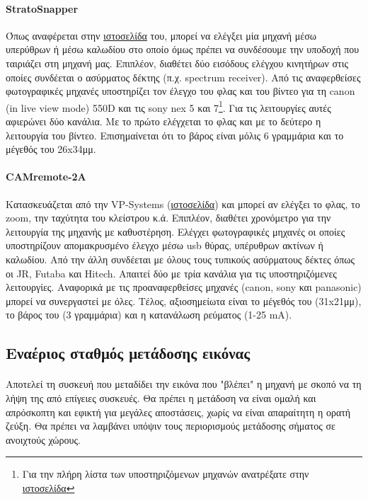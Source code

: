 \documentclass[a4paper, 12pt, twoside]{report}
\begin{document}
{{{{{{			\paragraph{StratoSnapper}{Όπως αναφέρεται στην \href{http://littlesmartthings.com/stratosnapper/}{ιστοσελίδα} του, μπορεί να ελέγξει μία μηχανή μέσω υπερύθρων ή μέσω καλωδίου στο οποίο όμως πρέπει να συνδέσουμε την υποδοχή που ταιριάζει στη μηχανή μας. Επιπλέον, διαθέτει δύο εισόδους ελέγχου κινητήρων στις οποίες συνδέεται ο ασύρματος δέκτης (π.χ. spectrum receiver). Από τις αναφερθείσες φωτογραφικές μηχανές υποστηρίζει τον έλεγχο του φλας και του βίντεο για τη canon (in live view mode) 550D και τις sony nex 5 και 7\footnote{Για την πλήρη λίστα των υποστηριζόμενων μηχανών ανατρέξατε στην \href{http://littlesmartthings.com/stratosnapper-supported-cameras/}{ιστοσελίδα}}. Για τις λειτουργίες αυτές αφιερώνει δύο κανάλια. Με το πρώτο ελέγχεται το φλας και με το δεύτερο η λειτουργία του βίντεο. Επισημαίνεται ότι το βάρος είναι μόλις 6 γραμμάρια και το μέγεθός του 26x34μμ.
			}
			\paragraph{CAMremote-2A}{Κατασκευάζεται από την VP-Systems (\href{http://vp-systems.eu/camremote.html}{ιστοσελίδα}) και μπορεί αν ελέγξει το φλας, το zoom, την ταχύτητα του κλείστρου κ.ά. Επιπλέον, διαθέτει χρονόμετρο για την λειτουργία της μηχανής με καθυστέρηση. Ελέγχει φωτογραφικές μηχανές οι οποίες υποστηρίζουν απομακρυσμένο έλεγχο μέσω usb θύρας, υπέρυθρων ακτίνων ή καλωδίου. Από την άλλη συνδέεται με όλους τους τυπικούς ασύρματους δέκτες όπως οι JR, Futaba και Hitech. Απαιτεί δύο με τρία κανάλια για τις υποστηριζόμενες λειτουργίες. Αναφορικά με τις προαναφερθείσες μηχανές (canon, sony και panasonic) μπορεί να συνεργαστεί με όλες. Τέλος, αξιοσημείωτα είναι το μέγεθός του (31x21μμ), το βάρος του (3 γραμμάρια) και η κατανάλωση ρεύματος (1-25 mA).
			}
		
		\subsection{Εναέριος σταθμός μετάδοσης εικόνας}	
			\paragraph{}{Αποτελεί τη συσκευή που μεταδίδει την εικόνα που "βλέπει" η μηχανή με σκοπό να τη λήψη της από επίγειες συσκευές. Θα πρέπει η μετάδοση να είναι ομαλή και απρόσκοπτη και εφικτή για μεγάλες αποστάσεις, χωρίς να είναι απαραίτητη η ορατή ζεύξη. Θα πρέπει να λαμβάνει υπόψιν τους περιορισμούς μετάδοσης σήματος σε ανοιχτούς χώρους.
			}
		
}}}}}}
\end{document}
